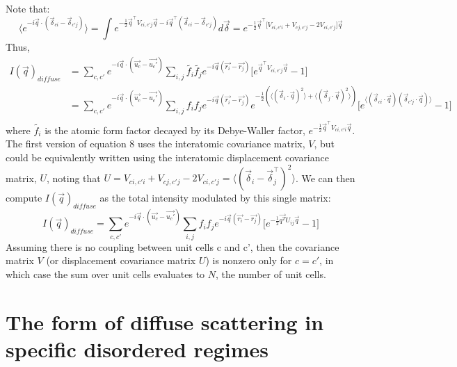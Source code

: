 \documentclass{article}
\begin{document}
Note that:
\begin{equation}
\langle e^{-i {\vec{q}} \cdot (\vec{\delta}_{ci} - \vec{\delta}_{c'j}) } \rangle = \int e^{-\frac{1}{2} \vec{q}^\intercal V_{ci,c'j} \vec{q} - i \vec{q}^\intercal (\vec{\delta}_{ci} - \vec{\delta}_{c'j}) } d \vec{\delta} = e^{ -\frac{1}{2} \vec{q}^\intercal \lbrack V_{ci,c'i} + V_{cj,c'j} - 2V_{ci,c'j} \rbrack \vec{q} }
\end{equation}
Thus,
\begin{equation}
\begin{aligned}
I(\vec{q})_{diffuse} & = \sum\limits_{c,c'} e^{-i \vec{q} \cdot (\vec{u_c} - \vec{u_c'})} \sum\limits_{i,j} \tilde{f_i} \tilde{f_j} e^{-i \vec{q} (\vec{r_i} - \vec{r_j})} \lbrack e^{ \vec{q}^\intercal V_{ci,c'j} \vec{q} } - 1 \rbrack \\
& = \sum\limits_{c,c'} e^{-i \vec{q} \cdot (\vec{u_c} - \vec{u_c'})} \sum\limits_{i,j} f_i f_j e^{-i \vec{q} (\vec{r_i} - \vec{r_j})} e^{-\frac{1}{2} (\langle (\vec{\delta}_i \cdot \vec{q})^2 \rangle + \langle (\vec{\delta}_j \cdot \vec{q})^2 \rangle) } \lbrack e^{\langle ( \vec{\delta}_{ci} \cdot \vec{q} ) ( \vec{\delta}_{c'j} \cdot \vec{q} ) \rangle} - 1 \rbrack \\
\end{aligned}
\end{equation}
where $\tilde{f_i}$ is the atomic form factor decayed by its Debye-Waller factor, $e^{ -\frac{1}{2} \vec{q}^\intercal V_{ci,c'i} \vec{q} }$. The first version of equation 8 uses the interatomic covariance matrix, $V$, but could be equivalently written using the interatomic displacement covariance matrix, $U$, noting that $U = V_{ci,c'i} + V_{cj,c'j} - 2V_{ci,c'j} = \langle (\vec{\delta}_i - \vec{\delta}_j ^\intercal)^2 \rangle $. We can then compute $I(\vec{q})_{diffuse}$ as the total intensity modulated by this single matrix:
\begin{equation}
I(\vec{q})_{diffuse} = \sum\limits_{c,c'} e^{-i \vec{q} \cdot (\vec{u_c} - \vec{u_c'})} \sum\limits_{i,j} f_i f_j e^{-i \vec{q} (\vec{r_i} - \vec{r_j})} \lbrack e^{-\frac{1}{2}\vec{q^T}U_{ij}\vec{q}} - 1 \rbrack
\end{equation}
Assuming there is no coupling between unit cells c and c', then the covariance matrix $V$ (or displacement covariance matrix $U$) is nonzero only for $c=c'$, in which case the sum over unit cells evaluates to $N$, the number of unit cells.

\section{The form of diffuse scattering in specific disordered regimes}
\end{document}
